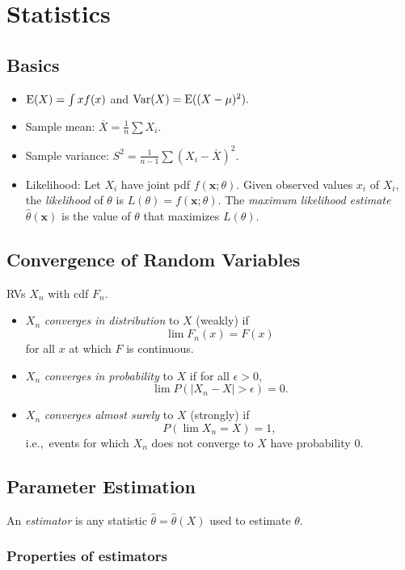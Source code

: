 \chapter{Statistics}
\section{Basics}
\begin{itemize}
	\item $\operatorname{E}(X) = \int xf(x)$ and $\operatorname{Var}(X) = \operatorname{E}((X-\mu)^2).$
	\item Sample mean: $\overline{X} = \frac{1}{n}\sum X_i.$
	\item Sample variance: $S^2 = \frac{1}{n-1}\sum (X_i - \overline{X})^2.$
	\item Likelihood: Let $X_i$ have joint pdf $f(\mathbf{x};\theta).$ Given observed values $x_i$ of $X_i,$ the \textit{likelihood} of $\theta$ is $L(\theta) = f(\mathbf{x};\theta).$ The \textit{maximum likelihood estimate} $\hat{\theta}(\mathbf{x})$ is the value of $\theta$ that maximizes $L(\theta).$
\end{itemize}

\section{Convergence of Random Variables}
RVs $X_n$ with cdf $F_n.$
\begin{itemize}
	\item $X_n$ \textit{converges in distribution} to $X$ (weakly) if \[\lim F_n(x) = F(x)\] for all $x$ at which $F$ is continuous.
	\item $X_n$ \textit{converges in probability} to $X$ if for all $\epsilon > 0,$
	\[ \lim P(|X_n - X| > \epsilon) = 0. \]
	\item $X_n$ \textit{converges almost surely} to $X$ (strongly) if 
	\[ P\left(\lim X_n = X\right) = 1, \]
	i.e.,\ events for which $X_n$ does not converge to $X$ have probability $0.$
\end{itemize}

\section{Parameter Estimation}
An \textit{estimator} is any statistic $\hat{\theta} = \hat{\theta}(X)$ used to estimate $\theta.$

\subsection{Properties of estimators}
